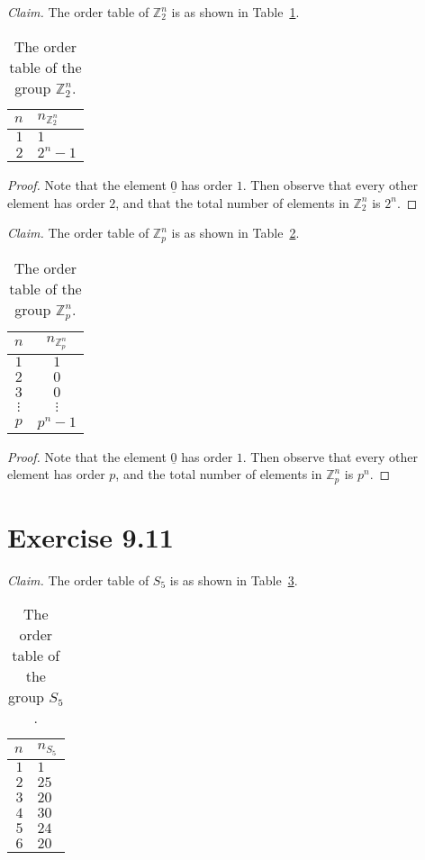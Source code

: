 \documentclass{abrice}
\newcommand{\Z}{\mathbb{Z}}
\newcommand{\Claim}{\noindent\emph{Claim.}\xspace}%
\begin{document}
\Claim The order table of $\Z_2^n$ is as shown in Table~\ref{tab:9.10.1}.

\begin{table}
  \centering
  \begin{tabular}{r|l}
    $n$ & $n_{\Z_2^n}$ \\
    \midrule
    $1$ & $1$ \\
    $2$ & $2^n - 1$ \\
  \end{tabular}
  \caption{The order table of the group $\Z_2^n$.}
  \label{tab:9.10.1}
\end{table}

\begin{proof}
  Note that the element $\underline{0}$ has order $1$. Then observe that
  every other element has order $2$, and that the total number of elements in
  $\Z_2^n$ is $2^n$.
\end{proof}

\Claim The order table of $\Z_p^n$ is as shown in Table~\ref{tab:9.10.2}.

\begin{table}
  \centering
  \begin{tabular}{c|c}
    $n$ & $n_{\Z_p^n}$ \\
    \midrule
    $1$ & $1$ \\
    $2$ & $0$ \\
    $3$ & $0$ \\
    $\vdots$ & $\vdots$ \\
    $p$ & $p^n -1$ \\
  \end{tabular}
  \caption{The order table of the group $\Z_p^n$.}
  \label{tab:9.10.2}
\end{table}

\begin{proof}
  Note that the element $\underline{0}$ has order $1$. Then observe that every
  other element has order $p$, and the total number of elements in $\Z_p^n$ is
  $p^n$.
\end{proof}

\section{Exercise 9.11}

\Claim The order table of $S_5$ is as shown in Table~\ref{tab:9.11}.

\begin{table}
  \centering
  \begin{tabular}{r|l}
    $n$ & $n_{S_5}$ \\
    \midrule
    $1$ & $1$ \\
    $2$ & $25$ \\
    $3$ & $20$ \\
    $4$ & $30$ \\
    $5$ & $24$ \\
    $6$ & $20$
  \end{tabular}
  \label{tab:9.11}
  \caption{The order table of the group $S_5$.}
\end{table}
\end{document}
